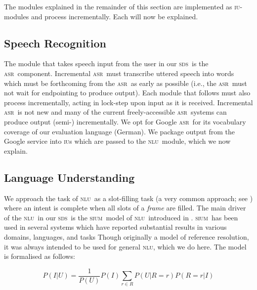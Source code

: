\documentclass[11pt]{article}
\newcommand{\sds}[0]{\textsc{sds}}
\newcommand{\nlu}[0]{\textsc{nlu}}
\newcommand{\sium}[0]{\textsc{sium}}
\newcommand{\asr}[0]{\textsc{asr}}
\newcommand{\iu}[0]{\textsc{iu}}
\begin{document}
The modules explained in the remainder of this section are implemented as \iu-modules and process incrementally. Each will now be explained. 

\subsection{Speech Recognition}

The module that takes speech input from the user in our \sds\ is the \asr\ component. Incremental \asr\ must transcribe uttered speech into words which must be forthcoming from the \asr\ as early as possible (i.e., the \asr\ must not wait for endpointing to produce output). Each module that follows must also process incrementally, acting in lock-step upon input as it is received. Incremental \asr\ is not new \cite{baumannetal2009:naacl} and many of the current freely-accessible \asr\ systems can produce output (semi-) incrementally. We opt for Google \asr\ for its vocabulary coverage of our evaluation language (German). We package output from the Google service into \iu s which are passed to the \nlu\ module, which we now explain. 

\subsection{Language Understanding}

We approach the task of \nlu\ as a slot-filling task (a very common approach; see ) where an intent is complete when all slots of a \emph{frame} are filled. The main driver of the \nlu\ in our \sds\ is the \sium\ model of \nlu\ introduced in . \sium\ has been used in several systems which have reported substantial results in various domains, languages, and tasks \cite{Han2015,Kennington2015_naacl,Kennington2016} Though originally a model of reference resolution, it was always intended to be used for general \nlu, which we do here. The model is formalised as follows:

\vspace{-0.25cm}
{\small
\begin{center}
\begin{equation}
   P(I|U) = \frac{1}{P(U)} P(I)\sum_{r\in R} P(U|R=r)P(R=r|I) 
\label{eq:disc1}
\end{equation}
\end{center}
}
\end{document}

